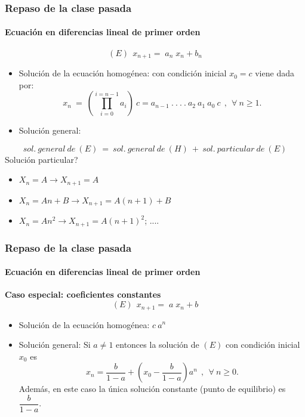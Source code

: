 \documentclass[11pt]{beamer}
\begin{document}
\begin{frame}
\frametitle{Repaso de la clase pasada}
\framesubtitle{Ecuación en diferencias lineal de primer orden}
\small
\[ \boxed{\ \ (E) \ \ x_{n+1}=\;a_n\; x_{n}+ b_n \ \ } \]

    \begin{itemize}
        \item Solución de la ecuación homogénea: con condici\'{o}n inicial $x_0=c$ viene dada por:
\[ x_n \ = \ \left(\prod_{i=0}^{i=n-1} a_i \right) \ c =  a_{n-1}\ .\ .\ .\ .\ a_2\ a_1\ a_0 \ c\ \ , \ \ \forall\ n \geq 1. \]
        \item Solución general: 
    \end{itemize}
\[ \boxed{\ \ sol.\ general\ de\ (E) \ = \  sol.\ general\ de\ (H) \ + \ sol.\ particular\ de\ (E) \ \ } \]
Solución particular?
\begin{itemize}
    \item $X_n=A \longrightarrow X_{n+1}= A$
    \item $X_n=A n + B\longrightarrow X_{n+1}= A (n+1) + B$
    \item $X_n=A n^2 \longrightarrow X_{n+1}= A (n+1)^2 $; ....
\end{itemize}
\end{frame}

\begin{frame}
\frametitle{Repaso de la clase pasada}
\framesubtitle{Ecuación en diferencias lineal de primer orden}
    
{\bf    Caso especial: coeficientes constantes}
    \[ \boxed{\ \ (E) \ \ x_{n+1}=\;a\; x_{n}+ b \ \ } \]
\begin{itemize}
        \item Solución de la ecuación homogénea: $c\ a^n$
        \item Solución general: Si $a\not=1$ entonces la soluci\'{o}n de $(E)$ con condici\'{o}n inicial $x_0$ es
\[ x_n=\dfrac{b}{1-a}+ \left( x_0 - \dfrac{b}{1-a} \right)a^n \ \ , \ \ \forall \  n \geq 0. \]
Adem\'{a}s, en este caso la \'{u}nica soluci\'{o}n constante (punto de equilibrio) es $\dfrac{b}{1-a}$.
    \end{itemize}
    
\end{frame}
\end{document}
